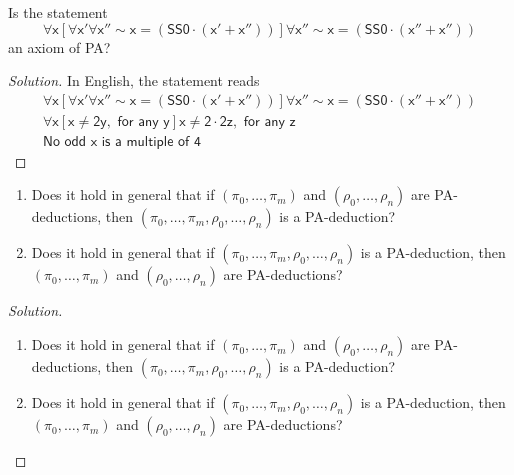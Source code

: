 \begin{problem}
  Is the statement
  \[
    \pmb{\mathsf{
    \forall x[\forall x' \forall x'' \sim x = (SS0 \cdot (x'+x''))]\forall x'' \sim x = (SS0 \cdot (x'' + x''))
    }}
  \]
  an axiom of PA?
\end{problem}
\begin{proof}[Solution]
  In English, the statement reads
  \[
  \begin{aligned}
  \pmb{\mathsf{
    \forall x[\forall x' \forall x'' \sim x = (SS0 \cdot (x'+x''))]\forall x'' \sim x = (SS0 \cdot (x'' + x''))
  }} \\
  \pmb{\mathsf{
    \forall x[x \neq 2y, \text{ for any y}] x \neq 2 \cdot 2z, \text{ for any z}
  }} \\
  \pmb{\mathsf{
    \text{No odd x is a multiple of 4}
  }}
  \end{aligned}
  \]
\end{proof}
\newpage


\begin{problem}
  \hfill

  \begin{enumerate}[font=\normalfont,label=\textbf{(\Alph*)}]
    \item Does it hold in general that if $(\pi_0, \ldots, \pi_m)$ and $(\rho_0, \ldots, \rho_n)$ are PA-deductions, then $(\pi_0, \ldots, \pi_m, \rho_0, \ldots, \rho_n)$ is a PA-deduction?

    \item Does it hold in general that if $(\pi_0, \ldots, \pi_m, \rho_0, \ldots, \rho_n)$ is a PA-deduction, then $(\pi_0, \ldots, \pi_m)$ and $(\rho_0, \ldots, \rho_n)$ are PA-deductions?
  \end{enumerate}
\end{problem}
\begin{proof}[Solution]
  \begin{enumerate}[font=\normalfont,label=\textbf{(\Alph*)}, wide]
    \item Does it hold in general that if $(\pi_0, \ldots, \pi_m)$ and $(\rho_0, \ldots, \rho_n)$ are PA-deductions, then $(\pi_0, \ldots, \pi_m, \rho_0, \ldots, \rho_n)$ is a PA-deduction?

    \item Does it hold in general that if $(\pi_0, \ldots, \pi_m, \rho_0, \ldots, \rho_n)$ is a PA-deduction, then $(\pi_0, \ldots, \pi_m)$ and $(\rho_0, \ldots, \rho_n)$ are PA-deductions?
  \end{enumerate}
\end{proof}
\newpage




